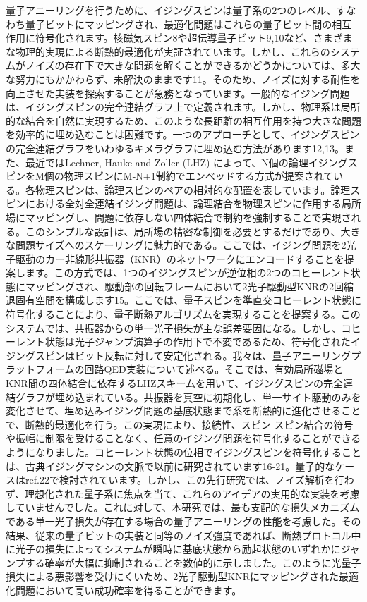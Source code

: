 量子アニーリングを行うために、イジングスピンは量子系の2つのレベル、すなわち量子ビットにマッピングされ、最適化問題はこれらの量子ビット間の相互作用に符号化されます。核磁気スピン8や超伝導量子ビット9,10など、さまざまな物理的実現による断熱的最適化が実証されています。しかし、これらのシステムがノイズの存在下で大きな問題を解くことができるかどうかについては、多大な努力にもかかわらず、未解決のままです11。そのため、ノイズに対する耐性を向上させた実装を探索することが急務となっています。一般的なイジング問題は、イジングスピンの完全連結グラフ上で定義されます。しかし、物理系は局所的な結合を自然に実現するため、このような長距離の相互作用を持つ大きな問題を効率的に埋め込むことは困難です。一つのアプローチとして、イジングスピンの完全連結グラフをいわゆるキメラグラフに埋め込む方法があります12,13。また、最近ではLechner, Hauke and Zoller (LHZ) によって、N個の論理イジングスピンをM個の物理スピンにM-N+1制約でエンベッドする方式が提案されている。各物理スピンは、論理スピンのペアの相対的な配置を表しています。論理スピンにおける全対全連結イジング問題は、論理結合を物理スピンに作用する局所場にマッピングし、問題に依存しない四体結合で制約を強制することで実現される。このシンプルな設計は、局所場の精密な制御を必要とするだけであり、大きな問題サイズへのスケーリングに魅力的である。ここでは、イジング問題を2光子駆動のカー非線形共振器（KNR）のネットワークにエンコードすることを提案します。この方式では、1つのイジングスピンが逆位相の2つのコヒーレント状態にマッピングされ、駆動部の回転フレームにおいて2光子駆動型KNRの2回縮退固有空間を構成します15。ここでは、量子スピンを準直交コヒーレント状態に符号化することにより、量子断熱アルゴリズムを実現することを提案する。このシステムでは、共振器からの単一光子損失が主な誤差要因になる。しかし、コヒーレント状態は光子ジャンプ演算子の作用下で不変であるため、符号化されたイジングスピンはビット反転に対して安定化される。我々は、量子アニーリングプラットフォームの回路QED実装について述べる。そこでは、有効局所磁場とKNR間の四体結合に依存するLHZスキームを用いて、イジングスピンの完全連結グラフが埋め込まれている。共振器を真空に初期化し、単一サイト駆動のみを変化させて、埋め込みイジング問題の基底状態まで系を断熱的に進化させることで、断熱的最適化を行う。この実現により、接続性、スピン-スピン結合の符号や振幅に制限を受けることなく、任意のイジング問題を符号化することができるようになりました。コヒーレント状態の位相でイジングスピンを符号化することは、古典イジングマシンの文脈で以前に研究されています16-21。量子的なケースはref.22で検討されています。しかし、この先行研究では、ノイズ解析を行わず、理想化された量子系に焦点を当て、これらのアイデアの実用的な実装を考慮していませんでした。これに対して、本研究では、最も支配的な損失メカニズムである単一光子損失が存在する場合の量子アニーリングの性能を考慮した。その結果、従来の量子ビットの実装と同等のノイズ強度であれば、断熱プロトコル中に光子の損失によってシステムが瞬時に基底状態から励起状態のいずれかにジャンプする確率が大幅に抑制されることを数値的に示しました。このように光量子損失による悪影響を受けにくいため、2光子駆動型KNRにマッピングされた最適化問題において高い成功確率を得ることができます。


